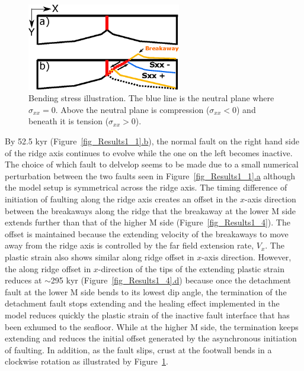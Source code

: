 \begin{figure}[h]
  \centering
    \includegraphics[width=0.6\textwidth]{./Figures/fig_Results4_8_sqrt_cut_back_bending_cartoon.eps}
  \caption{Bending stress illustration. The blue line is the neutral plane where $\sigma_{xx}=0$. Above the neutral plane is compression ($\sigma_{xx}<0$) and beneath it is tension ($\sigma_{xx}>0$).}
 \label{fig_Results4_8}
\end{figure}

By 52.5 kyr (Figure~\hyperref[fig_Results1_1]{\ref{fig_Results1_1}.b}), the normal fault on the right hand side of the ridge axis continues to evolve while the one on the left becomes inactive. The choice of which fault to delvelop seems to be made due to a small numerical perturbation between the two faults seen in Figure~\hyperref[fig_Results1_1]{\ref{fig_Results1_1}.a} although the model setup is symmetrical across the ridge axis. The timing difference of initiation of faulting along the ridge axis creates an offset in the $x$-axis direction between the breakaways along the ridge that the breakaway at the lower M side extends further than that of the higher M side (Figure~\hyperref[fig_Results1_4]{\ref{fig_Results1_4}}). The offset is maintained because the extending velocity of the breakaways to move away from the ridge axis is controlled by the far field extension rate, $V_{x}$. The plastic strain also shows similar along ridge offset in $x$-axis direction. However, the along ridge offset in $x$-direction of the tips of the extending plastic strain reduces at $\sim$295 kyr (Figure~\hyperref[fig_Results1_4]{\ref{fig_Results1_4}.d}) because once the detachment fault at the lower M side bends to its lowest dip angle, the termination of the detachment fault stops extending and the healing effect implemented in the model reduces quickly the plastic strain of the inactive fault interface that has been exhumed to the seafloor. While at the higher M side, the termination keeps extending and reduces the initial offset generated by the asynchronous initiation of faulting. In addition, as the fault slips, crust at the footwall bends in a clockwise rotation as illustrated by Figure~\hyperref[fig_Results4_8]{\ref{fig_Results4_8}}. %


